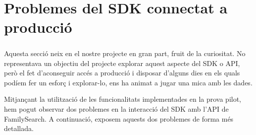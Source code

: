 \chapter{Problemes del SDK connectat a producció}

    \paragraph{}
    Aquesta secció neix en el nostre projecte en gran part, fruit de la curiositat. No representava un objectiu del projecte explorar aquest aspecte del SDK o API, però el fet d'aconseguir accés a producció i disposar d'alguns dies en els quals podíem fer un esforç i explorar-lo, ens ha animat a jugar una mica amb les dades.

    Mitjançant la utilització de les funcionalitats implementades en la prova pilot, hem pogut observar dos problemes en la interacció del SDK amb l'API de FamilySearch. A continuació, exposem aquests dos problemes de forma més detallada.

    
    
